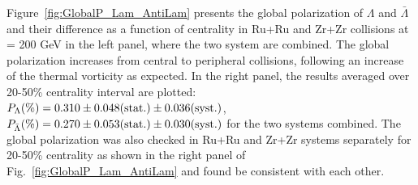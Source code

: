 \documentclass[preprint,5p,times,twocolumn]{elsarticle}
\begin{document}
Figure~\ref{fig:GlobalP_Lam_AntiLam} presents the global polarization of $\Lambda$ and $\bar\Lambda$ and their difference as a function of centrality in Ru+Ru and Zr+Zr collisions at \snn = 200 GeV in the left panel, where the two system are combined.
The global polarization increases from central to peripheral collisions, following an increase of the thermal vorticity as expected. In the right panel, the results averaged over 20-50\% centrality interval are plotted: $P_{\Lambda} (\%) = 0.310\pm0.048({\rm stat.})\pm0.036({\rm syst.})$, $P_{\bar\Lambda} (\%) = 0.270\pm0.053({\rm stat.})\pm0.030({\rm syst.})$ for the two systems combined. The global polarization was also checked in Ru+Ru and Zr+Zr systems separately for 20-50\% centrality as shown in the right panel of Fig.~\ref{fig:GlobalP_Lam_AntiLam} and found be consistent with each other.
\end{document}
